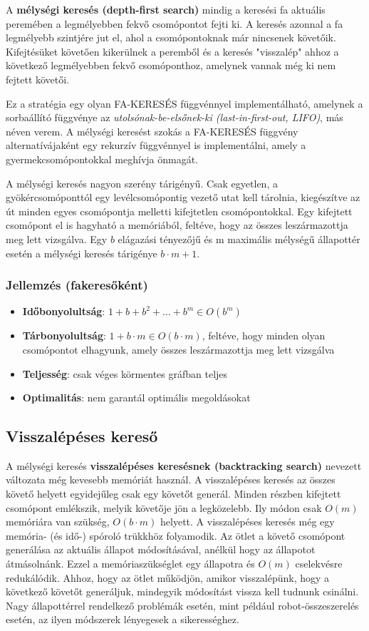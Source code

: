 A {\bf mélységi keresés (depth-first search)} mindig a keresési fa aktuális
peremében a legmélyebben fekvő csomópontot fejti ki. A keresés azonnal a fa
legmélyebb szintjére jut el, ahol a csomópontoknak már nincsenek követőik.
Kifejtésüket követően kikerülnek a peremből és a keresés "visszalép" ahhoz a
következő legmélyebben fekvő csomóponthoz, amelynek vannak még ki nem fejtett
követői.

Ez a stratégia egy olyan FA-KERESÉS függvénnyel implementálható, amelynek a
sorbaállító függvénye az {\it utolsónak-be-elsőnek-ki (last-in-first-out,
LIFO)}, más néven verem. A mélységi keresést szokás a FA-KERESÉS függvény
alternatívájaként egy rekurzív függvénnyel is implementálni, amely a
gyermekcsomópontokkal meghívja önmagát.

A mélységi keresés nagyon szerény tárigényű. Csak egyetlen, a
gyökércsomóponttól egy levélcsomópontig vezető utat kell tárolnia, kiegészítve
az út minden egyes csomópontja melletti kifejtetlen csomópontokkal. Egy
kifejtett csomópont el is hagyható a memóriából, feltéve, hogy az összes
leszármazottja meg lett vizsgálva. Egy $b$ elágazási tényezőjű és m maximális
mélységű állapottér esetén a mélységi keresés tárigénye $b\cdot m + 1$.

\subsubsection{Jellemzés (fakeresőként)}

\begin{itemize}
    \item {\bf Időbonyolultság}: $1 + b + b^2 + \ldots + b^m \in O(b^m)$
    \item {\bf Tárbonyolultság}: $1 + b\cdot m \in O(b \cdot m)$, feltéve, hogy
        minden olyan csomópontot elhagyunk, amely összes leszármazottja meg
        lett vizsgálva
    \item {\bf Teljesség}: csak véges körmentes gráfban teljes
    \item {\bf Optimalitás}: nem garantál optimális megoldásokat
\end{itemize}

\subsection{Visszalépéses kereső}

A mélységi keresés {\bf visszalépéses keresésnek (backtracking search)} nevezett
változata még kevesebb memóriát használ. A visszalépéses keresés az összes
követő helyett egyidejűleg csak egy követőt generál.  Minden részben kifejtett
csomópont emlékszik, melyik követője jön a legközelebb. Ily módon csak $O(m)$
memóriára van szükség, $O(b\cdot m)$ helyett. A visszalépéses keresés még egy memória-
(és idő-) spóroló trükkhöz folyamodik. Az ötlet a követő csomópont generálása
az aktuális állapot módosításával, anélkül hogy az állapotot átmásolnánk. Ezzel
a memóriaszükséglet egy állapotra és $O(m)$ cselekvésre redukálódik. Ahhoz, hogy
az ötlet működjön, amikor visszalépünk, hogy a következő követőt generáljuk,
mindegyik módosítást vissza kell tudnunk csinálni. Nagy állapottérrel
rendelkező problémák esetén, mint például robot-összeszerelés esetén, az ilyen
módszerek lényegesek a sikerességhez.

